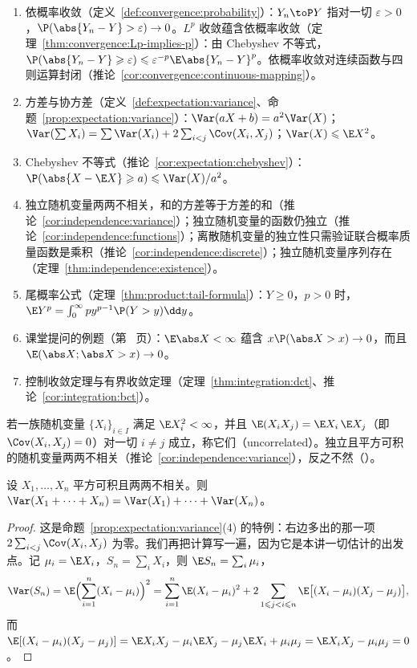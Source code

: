 \begin{enumerate}
\item 依概率收敛（定义~\ref{def:convergence:probability}）：$Y_n\toP Y$ 指对一切 $\varepsilon>0$，$\P(\abs{Y_n-Y}>\varepsilon)\to0$。$L^p$ 收敛蕴含依概率收敛（定理~\ref{thm:convergence:Lp-implies-p}）：由 Chebyshev 不等式，$\P(\abs{Y_n-Y}\geqslant\varepsilon)\leqslant\varepsilon^{-p}\E\abs{Y_n-Y}^p$。依概率收敛对连续函数与四则运算封闭（推论~\ref{cor:convergence:continuous-mapping}）。
\item 方差与协方差（定义~\ref{def:expectation:variance}、命题~\ref{prop:expectation:variance}）：$\Var(aX+b)=a^2\Var(X)$；$\Var(\sum X_i)=\sum\Var(X_i)+2\sum_{i<j}\Cov(X_i,X_j)$；$\Var(X)\leqslant \E X^2$。
\item Chebyshev 不等式（推论~\ref{cor:expectation:chebyshev}）：$\P(\abs{X-\E X}\geqslant a)\leqslant\Var(X)/a^2$。
\item 独立随机变量两两不相关，和的方差等于方差的和（推论~\ref{cor:independence:variance}）；独立随机变量的函数仍独立（推论~\ref{cor:independence:functions}）；离散随机变量的独立性只需验证联合概率质量函数是乘积（推论~\ref{cor:independence:discrete}）；独立随机变量序列存在（定理~\ref{thm:independence:existence}）。
\item 尾概率公式（定理~\ref{thm:product:tail-formula}）：$Y\geqslant0$，$p>0$ 时，$\E Y^p=\int_0^\infty py^{p-1}\P(Y>y)\dd y$。
\item 课堂提问的例题（第~\pageref{we:expectation:tP} 页）：$\E\abs X<\infty$ 蕴含 $x\P(\abs X>x)\to0$，而且 $\E(\abs X;\abs X>x)\to0$。
\item 控制收敛定理与有界收敛定理（定理~\ref{thm:integration:dct}、推论~\ref{cor:integration:bct}）。
\end{enumerate}


若一族随机变量 $\{X_i\}_{i\in I}$ 满足 $\E X_i^2<\infty$，并且 $\E(X_iX_j)=\E X_i\,\E X_j$（即 $\Cov(X_i,X_j)=0$）对一切 $i\neq j$ 成立，称它们（uncorrelated）。独立且平方可积的随机变量两两不相关（推论~\ref{cor:independence:variance}），反之不然（）。

\begin{theorem}\label{thm:weak-laws:variance-sum}
设 $X_1,\dots,X_n$ 平方可积且两两不相关。则 $\Var(X_1+\cdots+X_n)=\Var(X_1)+\cdots+\Var(X_n)$。
\end{theorem}
\begin{proof}
这是命题~\ref{prop:expectation:variance}(4) 的特例：右边多出的那一项 $2\sum_{i<j}\Cov(X_i,X_j)$ 为零。我们再把计算写一遍，因为它是本讲一切估计的出发点。记 $\mu_i=\E X_i$，$S_n=\sum_iX_i$，则 $\E S_n=\sum_i\mu_i$，
\[
\Var(S_n)=\E\Bigl(\sum_{i=1}^n(X_i-\mu_i)\Bigr)^2=\sum_{i=1}^n\E(X_i-\mu_i)^2+2\sum_{1\leqslant j<i\leqslant n}\E\bigl[(X_i-\mu_i)(X_j-\mu_j)\bigr],
\]
而 $\E[(X_i-\mu_i)(X_j-\mu_j)]=\E X_iX_j-\mu_i\E X_j-\mu_j\E X_i+\mu_i\mu_j=\E X_iX_j-\mu_i\mu_j=0$。
\end{proof}

